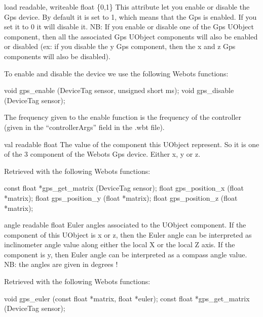 \noindent
\begin{description}
\begin{attribute}{load}
  {readable, writeable}
  {float}
  {\{0,1\}}
  This attribute let you enable or disable the Gps
  device.  By default it is set to 1, which means that the Gps is
  enabled. If you set it to 0 it will disable it. NB: If you enable or
  disable one of the Gps UObject component, then all the associated
  Gps UObject components will also be enabled or disabled (ex: if you
  disable the y Gps component, then the x and z Gps components will
  also be disabled).

  To enable and disable the device we use the following Webots
  functions:

\begin{cxx}
void gps_enable  (DeviceTag sensor, unsigned short ms);
void gps_disable (DeviceTag sensor);
\end{cxx}

The frequency given to the enable function is the frequency of the
\urbi controller (given in the ``controllerArgs'' field in the .wbt
file).
\end{attribute}

\begin{attribute}{val}
  {readable}
  {float}
  {}
  The value of the component this UObject represent. So it
 is one of the 3 component of the Webots Gps device. Either x, y or z.


 Retrieved with the following Webots functions:


\begin{cxx}
const float *gps_get_matrix  (DeviceTag sensor);
float gps_position_x (float *matrix);
float gps_position_y (float *matrix);
float gps_position_z (float *matrix);
\end{cxx}
\end{attribute}

\begin{attribute}{angle}
  {readable}
  {float}
  {}
  Euler angles associated to the UObject component. If the
 component of this UObject is x or z, then the Euler angle can be
 interpreted as inclinometer angle value along either the local X or
 the local Z axis. If the component is y, then Euler angle can be
 interpreted as a compass angle value. NB: the angles are given in
 degrees !


          Retrieved with the following Webots functions:


\begin{cxx}
void gps_euler (const float *matrix, float *euler);
const float *gps_get_matrix  (DeviceTag sensor);
\end{cxx}
\end{attribute}

\end{description}

